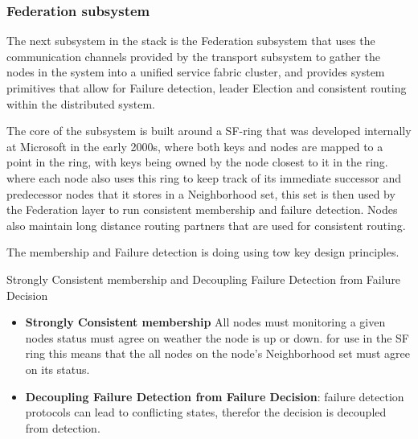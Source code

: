 \documentclass[a4paper,10pt,titlepage]{report}
\begin{document}
    \subsubsection{Federation subsystem}

    The next subsystem in the stack is the Federation subsystem that uses the communication channels provided by the transport subsystem to gather the nodes in the system into a unified service fabric cluster, and provides system primitives that allow for Failure detection, leader Election and consistent routing within the distributed system.\\
    \vspace{5mm}

    The core of the subsystem is built around a SF-ring that was developed internally at Microsoft in the early 2000s, where both keys and nodes are mapped to a point in the ring, with keys being owned by the node closest to it in the ring. where each node also uses this ring to keep track of its immediate successor and predecessor nodes that it stores in a Neighborhood set, this set is then used by the Federation layer to run consistent membership and failure detection. Nodes also maintain long distance routing partners that are used for consistent routing.\\
    \vspace{5mm}

    The membership and Failure detection is doing using tow key design principles.\\
    \vspace{5mm}

    Strongly Consistent membership and Decoupling Failure Detection from Failure Decision\\
    \vspace{5mm}

    \begin{itemize}
        \item \textbf{Strongly Consistent membership} All nodes must monitoring a given nodes status must agree on weather the node is up or down. for use in the SF ring this means that the all nodes on the node's Neighborhood set must agree on its status.
        \item \textbf{Decoupling Failure Detection from Failure Decision}: failure detection protocols can lead to conflicting states, therefor the decision is decoupled from detection.
    \end{itemize}
    \vspace{5mm}
\end{document}
